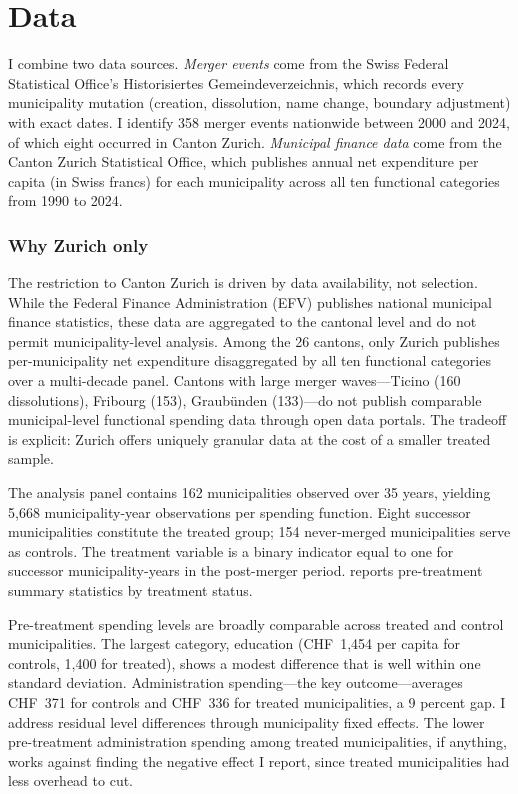\documentclass[12pt]{article}
\begin{document}
\section{Data}

I combine two data sources. \textit{Merger events} come from the Swiss Federal Statistical Office's Historisiertes Gemeindeverzeichnis, which records every municipality mutation (creation, dissolution, name change, boundary adjustment) with exact dates. I identify 358 merger events nationwide between 2000 and 2024, of which eight occurred in Canton Zurich. \textit{Municipal finance data} come from the Canton Zurich Statistical Office, which publishes annual net expenditure per capita (in Swiss francs) for each municipality across all ten functional categories from 1990 to 2024.

\subsubsection*{Why Zurich only} The restriction to Canton Zurich is driven by data availability, not selection. While the Federal Finance Administration (EFV) publishes national municipal finance statistics, these data are aggregated to the cantonal level and do not permit municipality-level analysis. Among the 26 cantons, only Zurich publishes per-municipality net expenditure disaggregated by all ten functional categories over a multi-decade panel. Cantons with large merger waves---Ticino (160 dissolutions), Fribourg (153), Graubünden (133)---do not publish comparable municipal-level functional spending data through open data portals. The tradeoff is explicit: Zurich offers uniquely granular data at the cost of a smaller treated sample.

The analysis panel contains 162 municipalities observed over 35 years, yielding 5,668 municipality-year observations per spending function. Eight successor municipalities constitute the treated group; 154 never-merged municipalities serve as controls. The treatment variable is a binary indicator equal to one for successor municipality-years in the post-merger period.  reports pre-treatment summary statistics by treatment status.

Pre-treatment spending levels are broadly comparable across treated and control municipalities. The largest category, education (CHF~1,454 per capita for controls, 1,400 for treated), shows a modest difference that is well within one standard deviation. Administration spending---the key outcome---averages CHF~371 for controls and CHF~336 for treated municipalities, a 9 percent gap. I address residual level differences through municipality fixed effects. The lower pre-treatment administration spending among treated municipalities, if anything, works against finding the negative effect I report, since treated municipalities had less overhead to cut.
\end{document}

